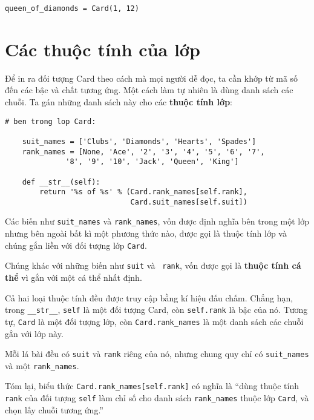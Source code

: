 \documentclass[11pt]{book}
\begin{document}
\beforeverb
\begin{verbatim}
queen_of_diamonds = Card(1, 12)
\end{verbatim}
\afterverb
%


\section{Các thuộc tính của lớp}


Để in ra đối tượng Card theo cách mà mọi người dễ đọc, ta cần khớp từ 
mã số đến các bậc và chất tương ứng. Một cách làm tự nhiên là dùng
danh sách các chuỗi. Ta gán những danh sách này cho các  {\bf thuộc tính
lớp}:

\beforeverb
\begin{verbatim}
# ben trong lop Card:

    suit_names = ['Clubs', 'Diamonds', 'Hearts', 'Spades']
    rank_names = [None, 'Ace', '2', '3', '4', '5', '6', '7', 
              '8', '9', '10', 'Jack', 'Queen', 'King']

    def __str__(self):
        return '%s of %s' % (Card.rank_names[self.rank],
                             Card.suit_names[self.suit])
\end{verbatim}
\afterverb
%
Các biến như \verb"suit_names" và \verb"rank_names", vốn được
định nghĩa bên trong một lớp nhưng bên ngoài bất kì một phương thức nào,
được gọi là thuộc tính lớp và chúng gắn liền với đối tượng lớp 
{\tt Card}.


Chúng khác với những biến như {\tt suit} và {\tt
  rank}, vốn được gọi là {\bf thuộc tính cá thể} vì gắn với một
cá thể nhất định.


Cả hai loại thuộc tính đều được truy cập bằng kí hiệu đấu chấm. 
Chẳng hạn, trong \verb"__str__", {\tt self} là một đối tượng Card,
còn {\tt self.rank} là bậc của nó.  Tương tự, {\tt Card}
là một đối tượng lớp, còn \verb"Card.rank_names" là một danh sách
các chuỗi gắn với lớp này.

Mỗi lá bài đều có {\tt suit} và {\tt rank} riêng của nó, nhưng 
chung quy chỉ có \verb"suit_names" và một \verb"rank_names".

Tóm lại, biểu thức
\verb"Card.rank_names[self.rank]" có nghĩa là ``dùng thuộc tính {\tt rank}
của đối tượng {\tt self} làm chỉ số cho danh sách \verb"rank_names"
thuộc lớp {\tt Card}, và chọn lấy chuỗi tương ứng.''
\end{document}
